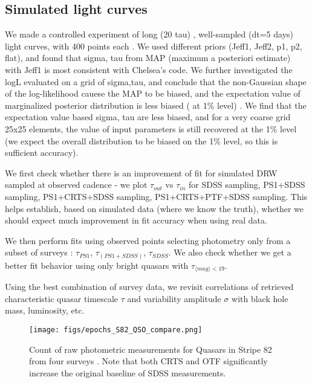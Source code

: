 \documentclass[fleqn,usenatbib]{mnras}  %
\begin{document}





\subsection{Simulated light curves}
We made a controlled experiment of long (20 tau) , well-sampled (dt=5 days) light curves,  with 400 points each . We used different priors (Jeff1, Jeff2, p1, p2, flat), and found that  sigma, tau from MAP (maximum a posteriori estimate) with Jeff1 is most consistent with Chelsea's code. We further investigated the logL evaluated on  a grid of sigma,tau, and conclude that the non-Gaussian shape of  the log-likelihood cauese the MAP to be biased, and the expectation value of marginalized posterior distribution is less biased  ( at 1\% level) . We find that the expectation value based sigma, tau are less biased, and for a very coarse grid 25x25 elements, the value of input parameters is  still recovered at the 1\% level (we expect the overall distribution to be biased on the 1\% level, so this is sufficient accuracy). 



We first check whether there is an improvement of fit for simulated DRW sampled at observed cadence - we plot $\tau_{out}$ vs $\tau_{in}$  for    SDSS sampling,    PS1+SDSS sampling,  PS1+CRTS+SDSS sampling,   PS1+CRTS+PTF+SDSS sampling.  This helps establish, based on simulated data (where we know the truth), whether we should expect much improvement in fit accuracy when using real data. 

We then perform fits using observed points selecting photometry only from a subset of surveys : $\tau_{PS1}$, $\tau_{(PS1+SDSS)}$,  $\tau_{SDSS}$.  We also check whether we get a better fit  behavior using only bright quasars with   $\tau_{\langle mag\rangle<19}$.

Using the best combination of survey data,  we revisit \cite{macleod2011} correlations of retrieved characteristic quasar timescale $\tau$ and variability amplitude $\sigma$ with black hole mass, luminosity, etc.  

\begin{figure}
\texttt{[image: figs/epochs\_S82\_QSO\_compare.png]}
\caption{Count  of raw photometric measurements for Quasars in Stripe 82 from four surveys . Note that both CRTS and OTF significantly increase the original baseline of SDSS measurements.}
\label{fig:baselines}
\end{figure} 









\bsp	%
\label{lastpage}
\end{document}
